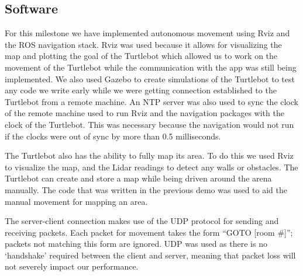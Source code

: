 \documentclass{article}
\begin{document}
\subsection{Software}
\par For this milestone we have implemented autonomous movement using Rviz and the ROS navigation stack. Rviz was used because it allows for visualizing the map and plotting the goal of the Turtlebot which allowed us to work on the movement of the Turtlebot while the communication with the app was still being implemented. We also used Gazebo to create simulations of the Turtlebot to test any code we write early while we were getting connection established to the Turtlebot from a remote machine. An NTP server was also used to sync the clock of the remote machine used to run Rviz and the navigation packages with the clock of the Turtlebot. This was necessary because the navigation would not run if the clocks were out of sync by more than 0.5 milliseconds.
\par The Turtlebot also has the ability to fully map its area. To do this we used Rviz to visualize the map, and the Lidar readings to detect any walls or obstacles. The Turtlebot can create and store a map while being driven around the arena manually. The code that was written in the previous demo was used to aid the manual movement for mapping an area. 
\par The server-client connection makes use of the UDP protocol for sending and receiving packets. Each packet for movement takes the form ``GOTO [room \#]''; packets not matching this form are ignored. UDP was used as there is no `handshake' required between the client and server, meaning that packet loss will not severely impact our performance.
\end{document}
